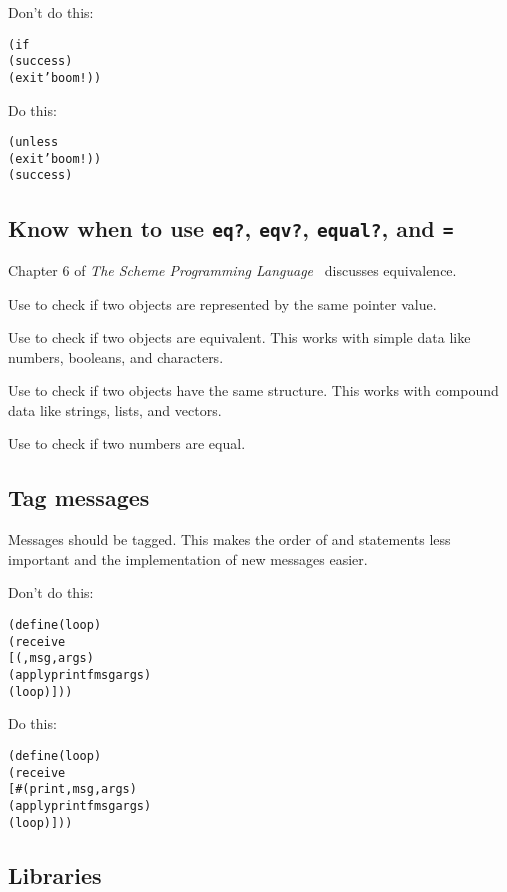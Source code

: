 \documentclass[letterpaper,11pt,twoside,final]{article}
\begin{document}
Don't do this:
\antipar
\begin{alltt}
(if 
    (success)
    (exit 'boom!))
\end{alltt}

Do this:
\antipar
\begin{alltt}
(unless 
  (exit 'boom!))
(success)
\end{alltt}

\subsection* {Know when to use \texttt{eq?}, \texttt{eqv?},
  \texttt{equal?}, and \texttt{=}}

Chapter 6 of \emph{The Scheme Programming
  Language}~\cite{the-scheme-programming-language} discusses
equivalence.

Use  to check if two objects are represented by the same
pointer value.

Use  to check if two objects are equivalent. This works
with simple data like numbers, booleans, and characters.

Use  to check if two objects have the same
structure. This works with compound data like strings, lists, and
vectors.

Use \code{=} to check if two numbers are equal.

\subsection* {Tag messages}

Messages should be tagged. This makes the order of 
and  statements less important and the implementation of
new messages easier.

Don't do this:
\antipar
\begin{alltt}
(define (loop)
  (receive
   [(,msg ,args)
    (apply printf msg args)
    (loop)]))
\end{alltt}

Do this:
\antipar
\begin{alltt}
(define (loop)
  (receive
   [\#(print ,msg ,args)
    (apply printf msg args)
    (loop)]))
\end{alltt}

\subsection* {Libraries}
\end{document}
